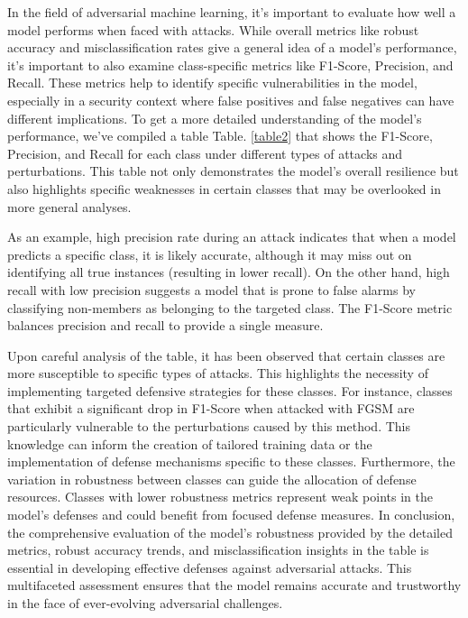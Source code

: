 \documentclass[10pt, conference, a4paper, final]{IEEEtran}
\begin{document}
In the field of adversarial machine learning, it's important to evaluate how well a model performs when faced with attacks. While overall metrics like robust accuracy and misclassification rates give a general idea of a model's performance, it's important to also examine class-specific metrics like F1-Score, Precision, and Recall. These metrics help to identify specific vulnerabilities in the model, especially in a security context where false positives and false negatives can have different implications. To get a more detailed understanding of the model's performance, we've compiled a table Table. \ref{table2} that shows the F1-Score, Precision, and Recall for each class under different types of attacks and perturbations. This table not only demonstrates the model's overall resilience but also highlights specific weaknesses in certain classes that may be overlooked in more general analyses.

As an example, high precision rate during an attack indicates that when a model predicts a specific class, it is likely accurate, although it may miss out on identifying all true instances (resulting in lower recall). On the other hand, high recall with low precision suggests a model that is prone to false alarms by classifying non-members as belonging to the targeted class. The F1-Score metric balances precision and recall to provide a single measure.

Upon careful analysis of the table, it has been observed that certain classes are more susceptible to specific types of attacks. This highlights the necessity of implementing targeted defensive strategies for these classes. For instance, classes that exhibit a significant drop in F1-Score when attacked with FGSM are particularly vulnerable to the perturbations caused by this method. This knowledge can inform the creation of tailored training data or the implementation of defense mechanisms specific to these classes.
Furthermore, the variation in robustness between classes can guide the allocation of defense resources. Classes with lower robustness metrics represent weak points in the model's defenses and could benefit from focused defense measures.
In conclusion, the comprehensive evaluation of the model's robustness provided by the detailed metrics, robust accuracy trends, and misclassification insights in the table is essential in developing effective defenses against adversarial attacks. This multifaceted assessment ensures that the model remains accurate and trustworthy in the face of ever-evolving adversarial challenges.
\end{document}
